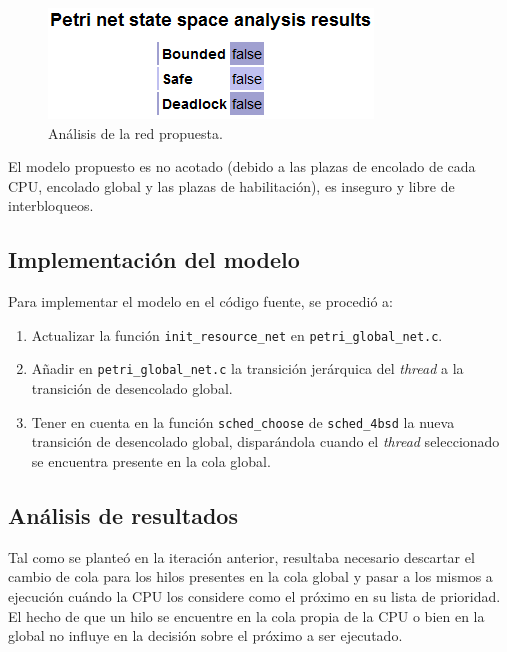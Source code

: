 \documentclass[a4paper]{book}
\begin{document}
\begin{figure} [H]
	\begin{center}
        \includegraphics[scale=0.7]{./imagenes/it9validacion.png}
		\caption{An\'alisis de la red propuesta.}
		\label{Fig:validacion9}
	\end{center}
\end{figure}

El modelo propuesto es no acotado (debido a las plazas de encolado de cada CPU, encolado global y las plazas de habilitaci\'on), es inseguro y libre de interbloqueos.

\subsection{Implementaci\'on del modelo}
Para implementar el modelo en el c\'odigo fuente, se procedi\'o a:
\begin{enumerate}
\item Actualizar la funci\'on \verb|init_resource_net| en \verb|petri_global_net.c|.
\item A\~nadir en \verb|petri_global_net.c| la transici\'on jer\'arquica del \emph{thread} a la transici\'on de desencolado global.
\item Tener en cuenta en la funci\'on \verb|sched_choose| de \verb|sched_4bsd| la nueva transici\'on de desencolado global, dispar\'andola cuando el \emph{thread} seleccionado se encuentra presente en la cola global.
\end{enumerate}

\subsection{An\'alisis de resultados}
Tal como se plante\'o en la iteraci\'on anterior, resultaba necesario descartar el cambio de cola para los hilos presentes en la cola global y pasar a los mismos a ejecuci\'on cu\'ando la CPU los considere como el pr\'oximo en su lista de prioridad. El hecho de que un hilo se encuentre en la cola propia de la CPU o bien en la global no influye en la decisi\'on sobre el pr\'oximo a ser ejecutado.\\
\end{document}
